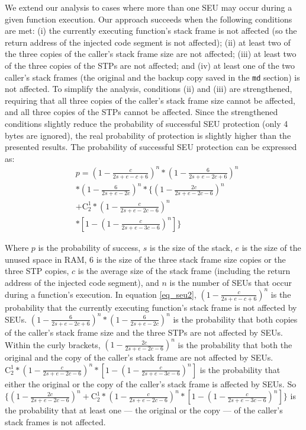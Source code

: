 We extend our analysis to cases where more than one SEU may occur during a given function execution. Our approach succeeds when the following conditions are met: (i) the currently executing function's stack frame is not affected (so the return address of the injected code segment is not affected); (ii) at least two of the three copies of the caller's stack frame size are not affected; (iii) at least two of the three copies of the STPs are not affected; and (iv) at least one of the two caller's stack frames (the original and the backup copy saved in the \texttt{md} section) is not affected. To simplify the analysis, conditions (ii) and (iii) are strengthened, requiring that all three copies of the caller's stack frame size cannot be affected, and all three copies of the STPs cannot be affected. Since the strengthened conditions slightly reduce the probability of successful SEU protection (only 4 bytes are ignored), the real probability of protection is slightly higher than the presented results. The probability of successful SEU protection can be expressed as:
\begin{equation}\label{eq_seu2}
\begin{split}
&p=(1-\frac{c}{2s+e-c+6})^n*(1-\frac{6}{2s+e-2c+6})^n \\
&*(1-\frac{6}{2s+e-2c})^n*\{(1-\frac{2c}{2s+e-2c-6})^n \\
&+ \mathrm{C}_2^1*(1-\frac{c}{2s+e-2c-6})^n\\
&*[1-(1-\frac{c}{2s+e-3c-6})^n]\}
\end{split}
\end{equation}

Where $p$ is the probability of success, $s$ is the size of the stack, $e$ is the size of the unused space in RAM, $6$ is the size of the three stack frame size copies or the three STP copies, $c$ is the average size of the stack frame (including the return address of the injected code segment), and $n$ is the number of SEUs that occur during a function's execution. In equation \ref{eq_seu2}, $(1-\frac{c}{2s+e-c+6})^n$ is the probability that the currently executing function's stack frame is not affected by SEUs. $(1-\frac{6}{2s+e-2c+6})^n*(1-\frac{6}{2s+e-2c})^n$ is the probability that both copies of the caller's stack frame size and the three STPs are not affected by SEUs. Within the curly brackets, $(1-\frac{2c}{2s+e-2c-6})^n$ is the probability that both the original and the copy of the caller's stack frame are not affected by SEUs. $\mathrm{C}_2^1*(1-\frac{c}{2s+e-2c-6})^n*[1-(1-\frac{c}{2s+e-3c-6})^n]$ is the probability that either the original or the copy of the caller's stack frame is affected by SEUs. So $\{(1-\frac{2c}{2s+e-2c-6})^n + \mathrm{C}_2^1*(1-\frac{c}{2s+e-2c-6})^n*[1-(1-\frac{c}{2s+e-3c-6})^n]\}$ is the probability that at least one --- the original or the copy --- of the caller's stack frames is not affected.

